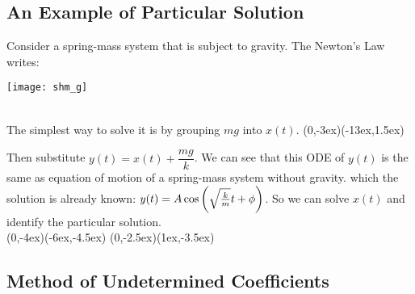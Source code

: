 \documentclass[class=article, crop=false, 12pt]{standalone}
\begin{document}
\subsection{An Example of Particular Solution}

Consider a spring-mass system that is subject to gravity. 
The Newton's  Law writes:

\begin{center}
    \begin{minipage}{0.4\linewidth}
        \centering
    \end{minipage}
    \hspace{0.05\textwidth}
    \begin{minipage}{0.15\linewidth}
        \centering
        \texttt{[image: shm\_g]}
    \end{minipage}
\end{center}


\hfill\\[1ex]
The simplest way to solve it is by grouping $mg$ into $x(t)$. 
{(0,-3ex)}{(-13ex,1.5ex)}

Then substitute $y(t) = x(t) + \dfrac{mg}{k}$. 
We can see that this ODE of $y(t)$ is the same as equation of motion of a spring-mass system without gravity.
which the solution is already known: $y(t) = A\cos\qty(\sqrt{\frac{k}{m}}t+\phi)$.
So we can solve $x(t)$ and identify the particular solution.
\\[4em]
{(0,-4ex)}{(-6ex,-4.5ex)}
{(0,-2.5ex)}{(1ex,-3.5ex)}


\subsection{Method of Undetermined Coefficients}
\end{document}
